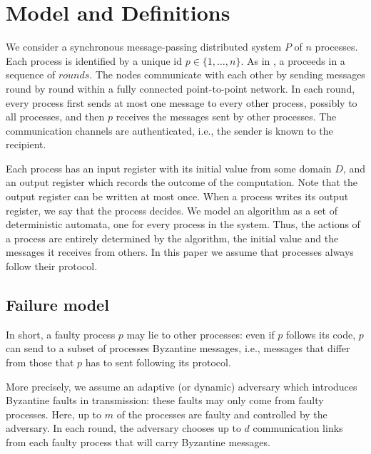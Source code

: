 \section{Model and Definitions}\label{model}
 
We consider a synchronous message-passing distributed system $P$ of $n$ processes. 
Each process is
identified by a unique id $p \in \{ 1, \ldots ,n \}$.  
As in {\cite{lamport1982byzantine,toueg1984simple}}, a
{} proceeds in a sequence of $rounds$.    
 The nodes communicate
with each other by sending messages round by round within a fully
connected 
point-to-point network.
In each round, every process first sends at most one message to every other process, possibly to all processes, 
and then $p$ receives the messages sent
by other  processes. The communication channels are authenticated, i.e., the sender is known to the recipient. 

Each process has
an input register with its initial value from some domain $D$, and an
output register  
which records the outcome of the computation.
Note that the output register can be written at most once. When a
process writes its output register, we say that the process decides.
We model an algorithm as a set of deterministic automata, one for
every process in the system. 
Thus, the actions of a process are entirely determined by the
algorithm, the initial value and the messages it receives from others. 
In this paper we assume that processes always follow their protocol.


\subsection{Failure model}
In short, a faulty process $p$ may lie to other processes: even if $p$ follows its code, 
$p$ can send to a subset of processes Byzantine messages, i.e., 
messages that differ from those that $p$ has to sent following its protocol.

More precisely, we assume an adaptive (or dynamic) adversary
which introduces Byzantine faults in transmission: these faults may
only come from faulty processes. Here, up to $m$ of the
processes are 
faulty and controlled by the adversary. In each round, the adversary chooses
up to $d$ communication links from each faulty process that
will carry Byzantine messages. 


